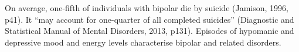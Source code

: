 On average, one-fifth of individuals with bipolar die by suicide (Jamison, 1996, p41). It “may account for one-quarter of all completed suicides” \cite{_diagnostic_2013}  (Diagnostic and Statistical Manual of Mental Disorders, 2013, p131).
Episodes of hypomanic and depressive mood and energy levels characterise bipolar and related disorders.